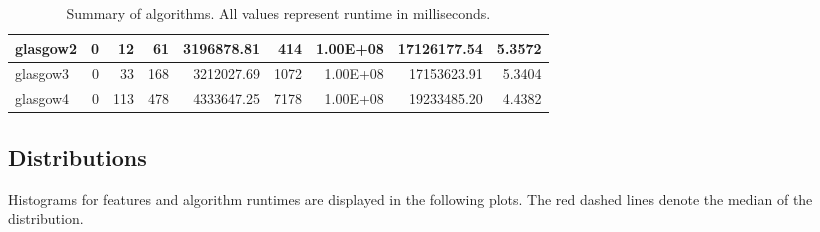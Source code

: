 \begin{table}[H]
{\begin{tabular}{|l|r|r|r|r|r|r|r|r|}
			glasgow2                                 & 0                                 & 12                                    & 61                                & 3196878.81                         & 414                                   & 1.00E+08                          & 17126177.54                      & 5.3572                                   \\ \hline
			glasgow3                                 & 0                                 & 33                                    & 168                               & 3212027.69                         & 1072                                  & 1.00E+08                          & 17153623.91                      & 5.3404                                   \\ \hline
			glasgow4                                 & 0                                 & 113                                   & 478                               & 4333647.25                         & 7178                                  & 1.00E+08                          & 19233485.20                      & 4.4382                                   \\ \hline
		\end{tabular}%
	}
	\caption[Summary of algorithms]{Summary of algorithms. All values represent runtime in milliseconds.}
	\label{tbl:algosummary}
\end{table}

\subsection{Distributions}
Histograms for features and algorithm runtimes are displayed in the following plots. The red dashed lines denote the median of the distribution.

